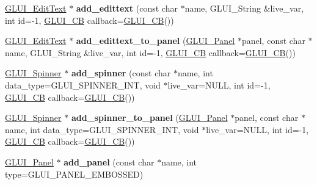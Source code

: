 \begin{DoxyCompactItemize}
\item 
\hypertarget{class_g_l_u_i_a151c92cdfb84eef5c16cdd3f7276fa93}{\hyperlink{class_g_l_u_i___edit_text}{G\+L\+U\+I\+\_\+\+Edit\+Text} $\ast$ {\bfseries add\+\_\+edittext} (const char $\ast$name, G\+L\+U\+I\+\_\+\+String \&live\+\_\+var, int id=-\/1, \hyperlink{class_g_l_u_i___c_b}{G\+L\+U\+I\+\_\+\+C\+B} callback=\hyperlink{class_g_l_u_i___c_b}{G\+L\+U\+I\+\_\+\+C\+B}())}\label{class_g_l_u_i_a151c92cdfb84eef5c16cdd3f7276fa93}

\item 
\hypertarget{class_g_l_u_i_a3cad8e9c9c67f0c0cafa7ecc730c0a51}{\hyperlink{class_g_l_u_i___edit_text}{G\+L\+U\+I\+\_\+\+Edit\+Text} $\ast$ {\bfseries add\+\_\+edittext\+\_\+to\+\_\+panel} (\hyperlink{class_g_l_u_i___panel}{G\+L\+U\+I\+\_\+\+Panel} $\ast$panel, const char $\ast$name, G\+L\+U\+I\+\_\+\+String \&live\+\_\+var, int id=-\/1, \hyperlink{class_g_l_u_i___c_b}{G\+L\+U\+I\+\_\+\+C\+B} callback=\hyperlink{class_g_l_u_i___c_b}{G\+L\+U\+I\+\_\+\+C\+B}())}\label{class_g_l_u_i_a3cad8e9c9c67f0c0cafa7ecc730c0a51}

\item 
\hypertarget{class_g_l_u_i_a1e804f1a12db884722ef68b8a0015aca}{\hyperlink{class_g_l_u_i___spinner}{G\+L\+U\+I\+\_\+\+Spinner} $\ast$ {\bfseries add\+\_\+spinner} (const char $\ast$name, int data\+\_\+type=G\+L\+U\+I\+\_\+\+S\+P\+I\+N\+N\+E\+R\+\_\+\+I\+N\+T, void $\ast$live\+\_\+var=N\+U\+L\+L, int id=-\/1, \hyperlink{class_g_l_u_i___c_b}{G\+L\+U\+I\+\_\+\+C\+B} callback=\hyperlink{class_g_l_u_i___c_b}{G\+L\+U\+I\+\_\+\+C\+B}())}\label{class_g_l_u_i_a1e804f1a12db884722ef68b8a0015aca}

\item 
\hypertarget{class_g_l_u_i_a4d63e9951414f2db52433d8de233c5c5}{\hyperlink{class_g_l_u_i___spinner}{G\+L\+U\+I\+\_\+\+Spinner} $\ast$ {\bfseries add\+\_\+spinner\+\_\+to\+\_\+panel} (\hyperlink{class_g_l_u_i___panel}{G\+L\+U\+I\+\_\+\+Panel} $\ast$panel, const char $\ast$name, int data\+\_\+type=G\+L\+U\+I\+\_\+\+S\+P\+I\+N\+N\+E\+R\+\_\+\+I\+N\+T, void $\ast$live\+\_\+var=N\+U\+L\+L, int id=-\/1, \hyperlink{class_g_l_u_i___c_b}{G\+L\+U\+I\+\_\+\+C\+B} callback=\hyperlink{class_g_l_u_i___c_b}{G\+L\+U\+I\+\_\+\+C\+B}())}\label{class_g_l_u_i_a4d63e9951414f2db52433d8de233c5c5}

\item 
\hypertarget{class_g_l_u_i_a0fb30bda1f47cdf06d1fc86c4e7f6c65}{\hyperlink{class_g_l_u_i___panel}{G\+L\+U\+I\+\_\+\+Panel} $\ast$ {\bfseries add\+\_\+panel} (const char $\ast$name, int type=G\+L\+U\+I\+\_\+\+P\+A\+N\+E\+L\+\_\+\+E\+M\+B\+O\+S\+S\+E\+D)}\label{class_g_l_u_i_a0fb30bda1f47cdf06d1fc86c4e7f6c65}


\end{DoxyCompactItemize}

